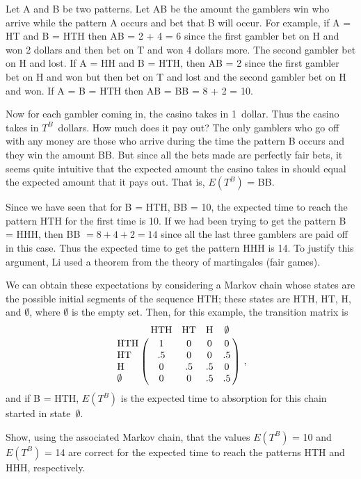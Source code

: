 \begin{LJSItem}
Let A and B be two patterns.  Let AB be the amount the gamblers win who
arrive while the pattern A occurs and bet that B will occur.
For example, if A = HT and B = HTH then AB = 2 + 4 = 6 since
the first gambler bet on H and won 2 dollars and then bet on T and won 4
dollars more. The
second gambler bet on H and lost.
If A = HH and B = HTH, then AB = 2 since the first gambler bet on H and won
but then 
bet on T and lost and the second gambler bet on H and won. If A = B = HTH
then AB = BB = 8 + 2 = 10.
\par
Now for each gambler coming in, the casino takes in 1~dollar. 
Thus the casino takes in $T^B$~dollars.  How much does it
pay out? The only gamblers who go off with any money are those who arrive
during the time the pattern B occurs and they win the amount BB. 
But since all the bets made are perfectly fair bets, it seems quite
intuitive that the expected amount the casino takes in should equal 
the expected amount that it pays out.  That is, $E(T^B)$ = BB.
\par
Since we have seen that for B = HTH,  BB = 10, the
expected time to reach the pattern HTH for the first time is 10. If we had been
trying to get the pattern B = HHH, then  BB $= 8 + 4 + 2 = 14$ since all the
last three gamblers are paid off in this case. Thus the expected time
to get the pattern HHH is 14. To justify this argument, Li
used a theorem from the theory of martingales (fair games).
\par
We can obtain these expectations by considering a Markov chain whose states
are the possible initial segments of the sequence HTH; these states are  
HTH, HT, H, and $\emptyset$, where
$\emptyset$ is the empty set.  Then, for this example, the transition matrix
is
$$
\bordermatrix{
&\mbox{HTH} & \mbox{HT} & \mbox{H} & \emptyset \cr
\mbox{HTH}  & 1 & 0 & 0 & 0 \cr
\mbox{HT}   & .5 & 0 & 0 & .5 \cr
\mbox{H}    & 0 & .5 & .5 & 0 \cr
\emptyset   & 0 & 0 & .5 & .5 }\ ,
$$
and if B = HTH, $E(T^B)$ is the expected time to absorption for this chain
started in
state~$\emptyset$.
\par
Show, using the associated Markov chain, that the values $E(T^B)$ = 10 and
$E(T^B)$
= 14 are correct for the expected time to reach the patterns HTH and HHH,
respectively.


\end{LJSItem}
